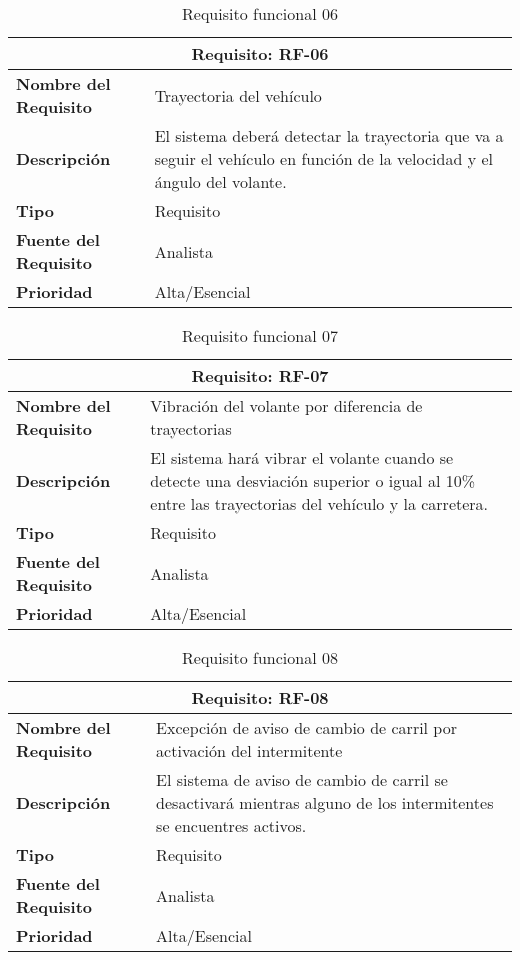 \begin{table}[H]
\begin{center}
\begin{tabular}{p{} p{7cm}}
\multicolumn{2}{c}{\textbf{Requisito: RF-06} } \\
\hline \hline
\textbf{Nombre del Requisito} & Trayectoria del vehículo\\
\hline
\textbf{Descripción} & El sistema deberá detectar la trayectoria que va a seguir el vehículo en función de la velocidad y el ángulo del volante. \\
\hline
\textbf{Tipo} & Requisito  \\
\hline
\textbf{Fuente del Requisito} & Analista \\
\hline
\textbf{Prioridad} & Alta/Esencial  \\ \hline
\end{tabular}
\caption{Requisito funcional 06}
\label{tab:RF-06}
\end{center}
\end{table}

\begin{table}[H]
\begin{center}
\begin{tabular}{p{} p{7cm}}
\multicolumn{2}{c}{\textbf{Requisito: RF-07} } \\
\hline \hline
\textbf{Nombre del Requisito} &  Vibración del volante por diferencia de trayectorias\\
\hline
\textbf{Descripción} & El sistema hará vibrar el volante cuando se detecte una desviación superior o igual al 10\% entre las trayectorias del vehículo y la carretera. \\
\hline
\textbf{Tipo} & Requisito  \\
\hline
\textbf{Fuente del Requisito} & Analista \\
\hline
\textbf{Prioridad} & Alta/Esencial  \\ \hline
\end{tabular}
\caption{Requisito funcional 07}
\label{tab:RF-07}
\end{center}
\end{table}

\begin{table}[H]
\begin{center}
\begin{tabular}{p{} p{7cm}}
\multicolumn{2}{c}{\textbf{Requisito: RF-08} } \\
\hline \hline
\textbf{Nombre del Requisito} &  Excepción de aviso de cambio de carril por activación del intermitente\\
\hline
\textbf{Descripción} & El sistema de aviso de cambio de carril se desactivará mientras alguno de los intermitentes se encuentres activos. \\
\hline
\textbf{Tipo} & Requisito  \\
\hline
\textbf{Fuente del Requisito} & Analista  \\
\hline
\textbf{Prioridad} & Alta/Esencial  \\ \hline
\end{tabular}
\caption{Requisito funcional 08}
\label{tab:RF-08}
\end{center}
\end{table}

